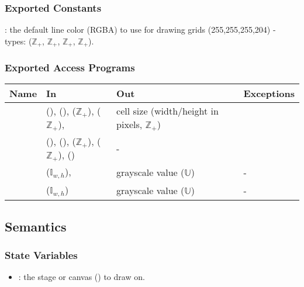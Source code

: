 \documentclass[12pt, titlepage]{article}
\begin{document}
\subsubsection{Exported Constants}
: the default line color (RGBA) to use for drawing grids (255,255,255,204)
 - types: ($\mathbb{Z}_+$, $\mathbb{Z}_+$, $\mathbb{Z}_+$, $\mathbb{Z}_+$).

\subsubsection{Exported Access Programs}

\begin{center}
\begin{tabular}{L{4.2cm} L{4.2cm} L{3.6cm} L{3cm}}
\hline
\textbf{Name} & \textbf{In} & \textbf{Out} & \textbf{Exceptions} \\
\hline
{} &  (),  (),
   ($\mathbb{Z}_+$),  ($\mathbb{Z}_+$), 
  & cell size (width/height in pixels, $\mathbb{Z}_+$) &  \\
\hline
{} &  (),  (),  ($\mathbb{Z}_+$),
   ($\mathbb{Z}_+$),  ()
  & - &  \\
\hline
{} &  ($\mathbb{I}_{w,h}$),
   & grayscale value ($\mathbb{U}$) & - \\
\hline
{} &  ($\mathbb{I}_{w,h}$) & grayscale value ($\mathbb{U}$) & - \\
\hline
\end{tabular}
\end{center}

\subsection{Semantics}

\subsubsection{State Variables}
\begin{itemize}
  \item {}: the stage or canvas () to draw on.
\end{itemize}
\end{document}
